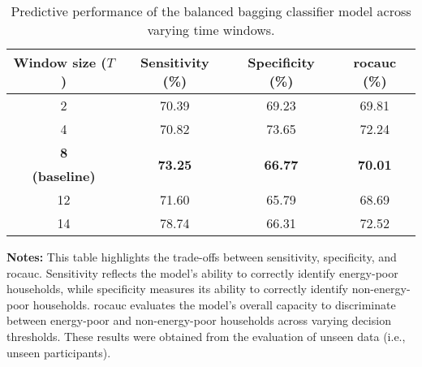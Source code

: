 \begin{table}
\centering
\small
\begin{threeparttable}
\caption{Predictive performance of the balanced bagging classifier model across varying time windows.}
\label{tab:my-table1}
\begin{tabular}{cccc}
\toprule
\textbf{Window size ($T$)} & \textbf{Sensitivity (\%)} & \textbf{Specificity (\%)} & \textbf{\Gls{rocauc} (\%)} \\
\midrule
2               & 70.39                     & 69.23                     & 69.81                 \\
4               & 70.82                     & 73.65                     & 72.24                 \\
\textbf{8}               & \multirow{2}{*}{\textbf{73.25}}    & \multirow{2}{*}{\textbf{66.77}}    & \multirow{2}{*}{\textbf{70.01}}\\
\textbf{(baseline)}      &                           &                           &                       \\
12              & 71.60                      & 65.79                     & 68.69                 \\
14              & 78.74                     & 66.31                     & 72.52                 \\
\bottomrule
\end{tabular}
\begin{tablenotes}
\small
\item {\bf Notes:} This table highlights the trade-offs between sensitivity, specificity, and \Gls{rocauc}. Sensitivity reflects the model's ability to correctly identify energy-poor households, while specificity measures its ability to correctly identify non-energy-poor households. \Gls{rocauc} evaluates the model's overall capacity to discriminate between energy-poor and non-energy-poor households across varying decision thresholds. These results were obtained from the evaluation of unseen data (i.e., unseen participants).
\end{tablenotes}
\end{threeparttable}
\end{table}